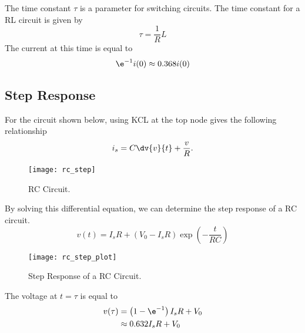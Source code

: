 \documentclass{article}
\begin{document}
\begin{definition}
    The time constant $\tau$ is a parameter for switching circuits. The time constant for a RL circuit is given by
    \begin{equation*}
        \tau = \frac{1}{R}L
    \end{equation*}
    The current at this time is equal to
    \begin{equation*}
        \e^{-1}i(0) \approx 0.368i(0)
    \end{equation*}
\end{definition}
\subsection{Step Response}
\begin{definition}
    For the circuit shown below, using KCL at the top node gives the following relationship
    \begin{equation*}
        i_s = C\dv{v}{t} + \frac{v}{R}.
    \end{equation*}
    \begin{figure}[H]
        \centering
        \texttt{[image: rc\_step]}
        \caption{RC Circuit.}
    \end{figure}
    By solving this differential equation, we can determine the step response of a
    RC circuit.
    \begin{equation*}
        v(t) = I_sR + \left(V_0 - I_sR\right) \exp{\left( -\frac{t}{RC} \right)}
    \end{equation*}
    \begin{figure}[H]
        \centering
        \texttt{[image: rc\_step\_plot]}
        \caption{Step Response of a RC Circuit.}
    \end{figure}
    The voltage at $t=\tau$ is equal to
    \begin{align*}
        v(\tau) & = \left(1 - \e^{-1}\right)I_sR + V_0 \\
                & \approx 0.632I_sR + V_0
    \end{align*}
\end{definition}
\end{document}
